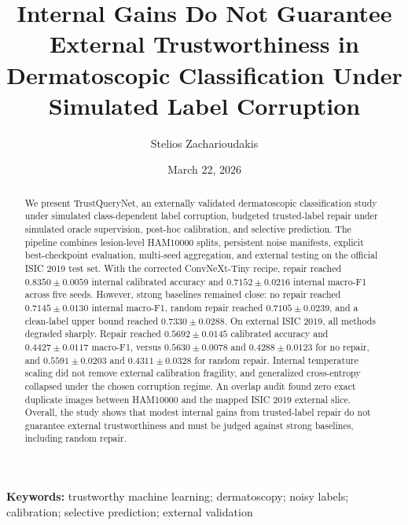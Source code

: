 \documentclass[11pt]{article}
\title{Internal Gains Do Not Guarantee External Trustworthiness in Dermatoscopic Classification Under Simulated Label Corruption}
\author{Stelios Zacharioudakis}
\date{March 22, 2026}
\begin{document}
\maketitle
\thispagestyle{empty}

\begin{abstract}
\noindent
We present TrustQueryNet, an externally validated dermatoscopic classification study under simulated class-dependent label corruption, budgeted trusted-label repair under simulated oracle supervision, post-hoc calibration, and selective prediction. The pipeline combines lesion-level HAM10000 splits, persistent noise manifests, explicit best-checkpoint evaluation, multi-seed aggregation, and external testing on the official ISIC 2019 test set. With the corrected ConvNeXt-Tiny recipe, repair reached $0.8350 \pm 0.0059$ internal calibrated accuracy and $0.7152 \pm 0.0216$ internal macro-F1 across five seeds. However, strong baselines remained close: no repair reached $0.7145 \pm 0.0130$ internal macro-F1, random repair reached $0.7105 \pm 0.0239$, and a clean-label upper bound reached $0.7330 \pm 0.0288$. On external ISIC 2019, all methods degraded sharply. Repair reached $0.5692 \pm 0.0145$ calibrated accuracy and $0.4427 \pm 0.0117$ macro-F1, versus $0.5630 \pm 0.0078$ and $0.4288 \pm 0.0123$ for no repair, and $0.5591 \pm 0.0203$ and $0.4311 \pm 0.0328$ for random repair. Internal temperature scaling did not remove external calibration fragility, and generalized cross-entropy collapsed under the chosen corruption regime. An overlap audit found zero exact duplicate images between HAM10000 and the mapped ISIC 2019 external slice. Overall, the study shows that modest internal gains from trusted-label repair do not guarantee external trustworthiness and must be judged against strong baselines, including random repair.
\end{abstract}

\vspace{1em}
\noindent\textbf{Keywords:} trustworthy machine learning; dermatoscopy; noisy labels; calibration; selective prediction; external validation
\end{document}
